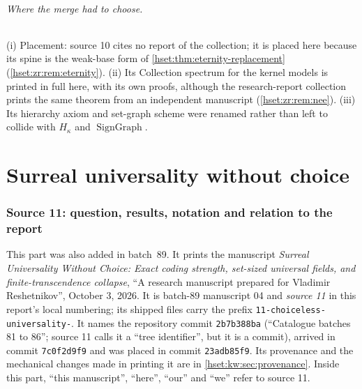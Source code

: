 \documentclass[11pt,letterpaper]{article}
\theoremstyle{definition}
\theoremstyle{remark}
\newcommand{\SG}{\operatorname{SignGraph}}
\begin{document}
\paragraph{Where the merge had to choose.} (i) Placement: source 10 cites no
report of the collection; it is placed here because its spine is the weak-base
form of \cref{hset:thm:eternity-replacement} (\cref{hset:zr:rem:eternity}).
(ii) Its Collection spectrum for the kernel models is printed in full here, with
its own proofs, although the research-report collection prints the same theorem
from an independent manuscript (\cref{hset:zr:rem:nee}). (iii) Its hierarchy
axiom and set-graph scheme were renamed rather than left to collide with
$H_\kappa$ and $\SG$.

\part{Surreal universality without choice}\label{hset:kw:part}

\section{Source 11: question, results, notation and relation to the report}
\label{hset:kw:sec:intro}

This part was also added in batch~89. It prints the manuscript \emph{Surreal
Universality Without Choice: Exact coding strength, set-sized universal fields,
and finite-transcendence collapse}, ``A research manuscript prepared for
Vladimir Reshetnikov'', October 3, 2026. It is batch-89 manuscript 04 and
\emph{source 11} in this report's local numbering; its shipped files carry the
prefix \texttt{11-choiceless-universality-}. It names the repository commit
\texttt{2b7b388ba} (``Catalogue batches 81 to 86''; source 11 calls it a ``tree
identifier'', but it is a commit), arrived in commit \texttt{7c0f2d9f9} and was
placed in commit \texttt{23adb85f9}. Its provenance and the mechanical changes
made in printing it are in \cref{hset:kw:sec:provenance}. Inside this part,
``this manuscript'', ``here'', ``our'' and ``we'' refer to source 11.
\end{document}
